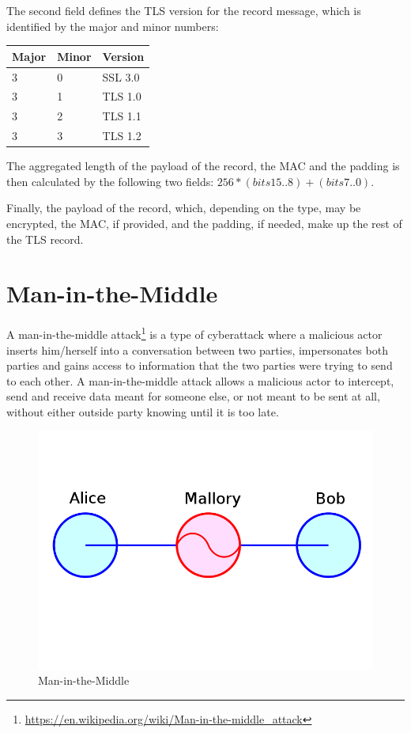 The second field defines the TLS version for the record message, which is
identified by the major and minor numbers:

\begin{table}[H] \centering \begin{tabular}{ | l | l | l | } \hline
\textbf{Major} & \textbf{Minor} & \textbf{Version} \\ \hline 3 & 0 & SSL 3.0 \\
3 & 1 & TLS 1.0 \\ 3 & 2 & TLS 1.1 \\ 3 & 3 & TLS 1.2 \\ \hline \end{tabular}
\end{table}

The aggregated length of the payload of the record, the MAC and the padding is
then calculated by the following two fields: \begin{math}256*(bits 15..8) +
(bits 7..0)\end{math}.

Finally, the payload of the record, which, depending on the type, may be
encrypted, the MAC, if provided, and the padding, if needed, make up the rest of
the TLS record.

\section{Man-in-the-Middle}\label{sec:mitm}

A man-in-the-middle attack\footnote{\url{https://en.wikipedia.org/wiki/Man-in-the-middle_attack}}
is a type of cyberattack where a malicious actor inserts him/herself into a conversation
between two parties, impersonates both parties and gains access to information that the two 
parties were trying to send to each other. A man-in-the-middle attack allows a malicious actor 
to intercept, send and receive data meant for someone else, or not meant to be sent at all, 
without either outside party knowing until it is too late. 

\begin{figure}[H] \caption{Man-in-the-Middle} \centering
\includegraphics[width=1\textwidth]{diagrams/mitm.png}\end{figure}


